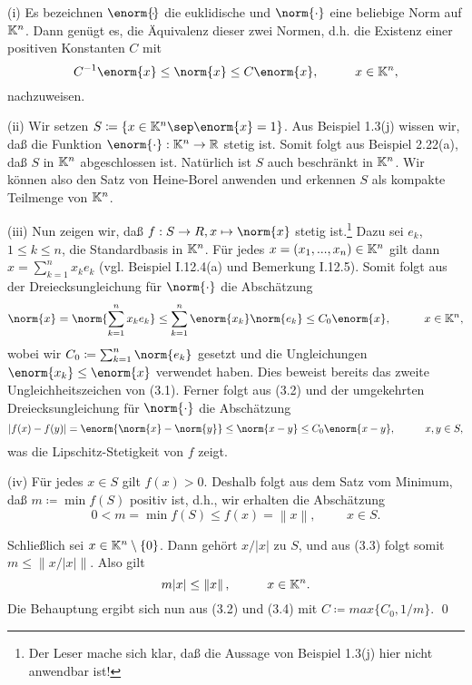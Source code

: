 \documentclass[a4paper,twoside]{book}
\begin{document}
\begin{Beweis0} (i) Es bezeichnen $\enorm{\!\cdot\!}$ die euklidische und $\norm{\cdot}$ eine beliebige Norm auf $\mathbb{K}^n$. Dann
genügt es, die Äquivalenz dieser zwei Normen, d.h. die Existenz einer positiven Konstanten
$C$ mit
\begin{equation}
C^{-1} \enorm{x} \le \norm{x} \le C \enorm{x}, \hspace{1cm} x \in \K^n ,
\end{equation}
nachzuweisen. \smallskip

(ii) Wir setzen $S \coloneqq \{ x \in \K^n \sep \enorm{x} = 1\}$. Aus Beispiel 1.3(j) wissen wir, daß die
Funktion $\enorm{\cdot} : \K^n \rightarrow \R$ stetig ist. Somit folgt aus Beispiel 2.22(a), daß $S$ in $\mathbb{K}^n$ abgeschlossen
ist. Natürlich ist $S$ auch beschränkt in $\mathbb{K}^n$. Wir können also den Satz von
Heine-Borel anwenden und erkennen $S$ als kompakte Teilmenge von $\mathbb{K}^n$.\smallskip

(iii) Nun zeigen wir, daß $f : S \rightarrow R, x \mapsto \norm{x}$ stetig ist.\footnote{Der Leser mache sich klar, daß die Aussage von Beispiel 1.3(j) hier nicht anwendbar ist!} 
Dazu sei $e_k$, $1 \le k \le n$, die Standardbasis in $\mathbb{K}^n$. 
Für jedes $x = (x_1, . . . ,x_n) \in \mathbb{K}^n$ gilt dann $x = \sum^n_{k=1} x_ke_k$ (vgl.
Beispiel I.12.4(a) und Bemerkung I.12.5). Somit folgt aus der Dreiecksungleichung für $\norm{\cdot}$ die Abschätzung
\begin{equation}
\norm{x} = \norm{\sum\limits_{k=1}^n x_ke_k} 
\le \sum\limits_{k=1}^n \enorm{x_k} \norm{e_k} \le C_0 \enorm{x}, \hspace{1cm} x \in \K^n,
\end{equation}
wobei wir $C_0 \coloneqq \sum_{k=1}^n \norm{e_k}$ gesetzt und die Ungleichungen 
$\enorm{x_k} \le \enorm{x}$ verwendet haben.
Dies beweist bereits das zweite Ungleichheitszeichen von (3.1). Ferner folgt aus (3.2) und
der umgekehrten Dreiecksungleichung für $\norm{\cdot}$ die Abschätzung
\begin{equation*}
|f(x) - f(y)| = \enorm{\norm{x}-\norm{y}} \le \norm{x - y} \le C_0 \enorm{x - y} , \hspace{1cm} x,y \in S ,
\end{equation*}
was die Lipschitz-Stetigkeit von $f$ zeigt. \smallskip

(iv) Für jedes $x \in S$ gilt $f(x) > 0$. Deshalb folgt aus dem Satz vom Minimum, daß
$m \coloneqq \min f(S)$ positiv ist, d.h., wir erhalten die Abschätzung
\begin{equation}
0 < m = \min f(S) \le f(x) = \left\lVert x \right\rVert , \hspace{1cm} x \in S .
\end{equation}

\noindent Schließlich sei $x \in \mathbb{K}^n\setminus\{0\}$. Dann gehört $x/|x|$ zu $S$, und aus (3.3) folgt somit 
$m \le \left\lVert x / |x| \right\rVert$.
Also gilt
\begin{equation}
m|x| \le \left\lVert x \right\rVert , \hspace{1cm} x \in \mathbb{K}^n .
\end{equation}
Die Behauptung ergibt sich nun aus (3.2) und (3.4) mit $C \coloneqq max\{C_0, 1/m\}$. \qed
\end{Beweis0}\smallskip
\end{document}
